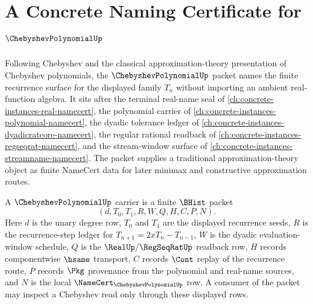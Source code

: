 \chapter{A Concrete Naming Certificate for $\ChebyshevPolynomialUp$}
\label{ch:concrete-instances-chebyshev-polynomial-namecert}

Following Chebyshev and the classical approximation-theory presentation of Chebyshev polynomials, the $\ChebyshevPolynomialUp$ packet names the finite recurrence surface for the displayed family $T_n$ without importing an ambient real-function algebra. It sits after the terminal real-name seal of \autoref{ch:concrete-instances-real-namecert}, the polynomial carrier of \autoref{ch:concrete-instances-polynomial-namecert}, the dyadic tolerance ledger of \autoref{ch:concrete-instances-dyadicratcore-namecert}, the regular rational readback of \autoref{ch:concrete-instances-regseqrat-namecert}, and the stream-window surface of \autoref{ch:concrete-instances-streamname-namecert}. The packet supplies a traditional approximation-theory object as finite NameCert data for later minimax and constructive approximation routes.

\begin{definition}\label{def:chebyshev-polynomial-carrier}
A $\ChebyshevPolynomialUp$ carrier is a finite $\BHist$ packet
$$
(d,T_0,T_1,R,W,Q,H,C,P,N).
$$
Here $d$ is the unary degree row, $T_0$ and $T_1$ are the displayed recurrence seeds, $R$ is the recurrence-step ledger for $T_{n+1}=2xT_n-T_{n-1}$, $W$ is the dyadic evaluation-window schedule, $Q$ is the $\RealUp/\RegSeqRatUp$ readback row, $H$ records componentwise $\hsame$ transport, $C$ records $\Cont$ replay of the recurrence route, $P$ records $\Pkg$ provenance from the polynomial and real-name sources, and $N$ is the local $\NameCert_{\ChebyshevPolynomialUp}$ row. A consumer of the packet may inspect a Chebyshev read only through these displayed rows.
\end{definition}

